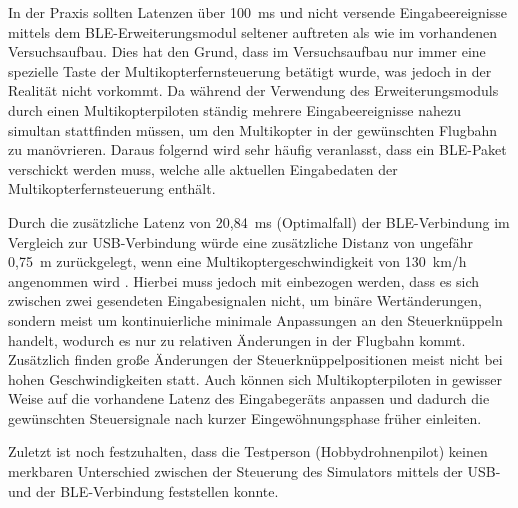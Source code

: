 In der Praxis sollten Latenzen über 100~ms und nicht versende Eingabeereignisse mittels dem \ac{BLE}-Erweiterungsmodul seltener auftreten als wie im vorhandenen Versuchsaufbau. Dies hat den Grund, dass im Versuchsaufbau nur immer eine spezielle Taste der Multikopterfernsteuerung betätigt wurde, was jedoch in der Realität nicht vorkommt. Da während der Verwendung des Erweiterungsmoduls durch einen Multikopterpiloten ständig mehrere Eingabeereignisse nahezu simultan stattfinden müssen, um den Multikopter in der gewünschten Flugbahn zu manövrieren. Daraus folgernd wird sehr häufig veranlasst, dass ein \ac{BLE}-Paket verschickt werden muss, welche alle aktuellen Eingabedaten der Multikopterfernsteuerung enthält.

Durch die zusätzliche Latenz von 20,84~ms (Optimalfall) der \ac{BLE}-Verbindung im Vergleich zur USB-Verbindung würde eine zusätzliche Distanz von ungefähr 0,75~m zurückgelegt, wenn eine Multikoptergeschwindigkeit von 130~km/h angenommen wird \cites{droneSpeed1}{droneSpeed2}{droneSpeed3}. Hierbei muss jedoch mit einbezogen werden, dass es sich zwischen zwei gesendeten Eingabesignalen nicht, um binäre Wertänderungen, sondern meist um kontinuierliche minimale Anpassungen an den Steuerknüppeln handelt, wodurch es nur zu relativen Änderungen in der Flugbahn kommt. Zusätzlich finden große Änderungen der Steuerknüppelpositionen meist nicht bei hohen Geschwindigkeiten statt. Auch können sich Multikopterpiloten in gewisser Weise auf die vorhandene Latenz des Eingabegeräts anpassen und dadurch die gewünschten Steuersignale nach kurzer Eingewöhnungsphase früher einleiten.

Zuletzt ist noch festzuhalten, dass die Testperson (Hobbydrohnenpilot) keinen merkbaren Unterschied zwischen der Steuerung des Simulators mittels der USB- und der \ac{BLE}-Verbindung feststellen konnte.